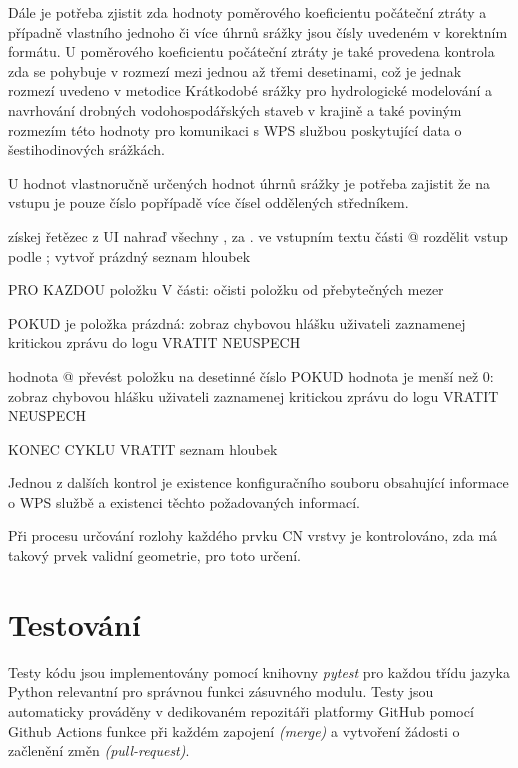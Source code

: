\documentclass[a4paper,oneside,12pt]{book}
\begin{document}
\hspace{10mm} Dále je potřeba zjistit zda hodnoty poměrového koeficientu počáteční ztráty a případně vlastního jednoho či více úhrnů srážky jsou čísly uvedeném v korektním formátu. U poměrového koeficientu počáteční ztráty je také provedena kontrola zda se pohybuje v rozmezí mezi jednou až třemi desetinami, což je jednak rozmezí uvedeno v metodice Krátkodobé srážky pro hydrologické modelování a navrhování drobných vodohospodářských staveb v krajině \cite{MNYDGwleJOjKLRU2} a také poviným rozmezím této hodnoty pro komunikaci s WPS službou poskytující data o šestihodinových srážkách.

\hspace{10mm} U hodnot vlastnoručně určených hodnot úhrnů srážky je potřeba zajistit že na vstupu je pouze číslo popřípadě více čísel oddělených středníkem.

\begin{pseudocode}[style=mypseudocode, caption={Ukázka kontroly uživatelského vstupu výšky úhrnu srážky},label={kod:runoff_check}]
 získej řetězec z UI
 nahraď všechny , za . ve vstupním textu
 části @ rozdělit vstup podle ;
 vytvoř prázdný seznam hloubek
 
 PRO KAZDOU položku V části:
    očisti položku od přebytečných mezer
    
    POKUD je položka prázdná:
        zobraz chybovou hlášku uživateli
        zaznamenej kritickou zprávu do logu
        VRATIT NEUSPECH

    hodnota @ převést položku na desetinné číslo
    POKUD hodnota je menší než 0:
        zobraz chybovou hlášku uživateli
        zaznamenej kritickou zprávu do logu
        VRATIT NEUSPECH

KONEC CYKLU
VRATIT seznam hloubek

\end{pseudocode}


\hspace{10mm} Jednou z dalších kontrol je existence konfiguračního souboru obsahující informace o WPS službě a existenci těchto požadovaných informací.

\hspace{10mm} Při procesu určování rozlohy každého prvku CN vrstvy je kontrolováno, zda má takový prvek validní geometrie, pro toto určení.

\section{Testování} \label{testing}
\hspace{10mm} Testy kódu jsou implementovány pomocí knihovny \textit{pytest} pro každou třídu jazyka Python relevantní pro správnou funkci zásuvného modulu. Testy jsou automaticky prováděny v dedikovaném repozitáři platformy GitHub pomocí Github Actions funkce při každém zapojení \textit{(merge)} a vytvoření žádosti o začlenění změn  \textit{(pull-request)}.
\end{document}
